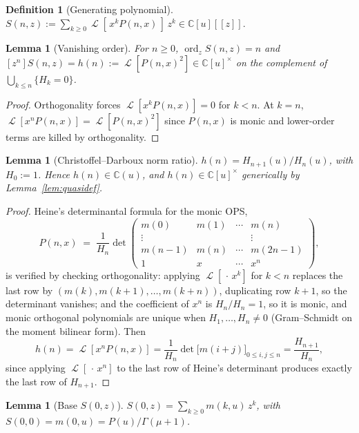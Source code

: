 \documentclass[11pt]{article}
\newtheorem{lemma}[theorem]{Lemma}
\theoremstyle{definition}
\newtheorem{definition}[theorem]{Definition}
\DeclareMathOperator{\Lop}{\mathcal{L}}
\DeclareMathOperator{\ord}{ord}
\begin{document}
\begin{definition}[Generating polynomial]\label{def:Sn}
$S(n,z) := \sum_{k\geq 0} \Lop[\, x^{k} P(n,x)\,]\, z^{k}
\in \mathbb{C}[u][[z]]$.
\end{definition}

\begin{lemma}[Vanishing order]\label{lem:vanord}
For $n\geq 0$,
$\ord_{z} S(n,z) = n$ and $[z^{n}] S(n,z) = h(n) := \Lop[P(n,x)^{2}]
\in \mathbb{C}[u]^{\times}$ on the complement of
$\bigcup_{k\leq n}\{H_{k}=0\}$.
\end{lemma}

\begin{proof}
Orthogonality forces $\Lop[x^{k} P(n,x)] = 0$ for $k < n$. At $k=n$,
$\Lop[x^{n} P(n,x)] = \Lop[P(n,x)^{2}]$ since $P(n,x)$ is monic and
lower-order terms are killed by orthogonality.
\end{proof}

\begin{lemma}[Christoffel--Darboux norm ratio]\label{lem:hratio}
$h(n) = H_{n+1}(u)/H_{n}(u)$, with $H_{0} := 1$. Hence
$h(n) \in \mathbb{C}(u)$, and $h(n) \in \mathbb{C}[u]^{\times}$
generically by Lemma~\ref{lem:quasidef}.
\end{lemma}

\begin{proof}
Heine's determinantal formula for the monic OPS,
\[
P(n,x) \;=\; \frac{1}{H_{n}}
\det\!\begin{pmatrix}
m(0) & m(1) & \cdots & m(n) \\
\vdots & & & \vdots \\
m(n-1) & m(n) & \cdots & m(2n-1) \\
1 & x & \cdots & x^{n}
\end{pmatrix},
\]
is verified by checking orthogonality: applying $\Lop[\,\cdot\,x^{k}]$
for $k < n$ replaces the last row by
$(m(k), m(k+1), \ldots, m(k+n))$, duplicating row $k+1$, so the
determinant vanishes; and the coefficient of $x^{n}$ is
$H_{n}/H_{n} = 1$, so it is monic, and monic orthogonal polynomials
are unique when $H_{1},\ldots,H_{n} \neq 0$ (Gram--Schmidt on the
moment bilinear form). Then
\[
h(n) = \Lop[x^{n} P(n,x)]
= \frac{1}{H_{n}} \det\!\bigl[ m(i+j) \bigr]_{0\leq i,j\leq n}
= \frac{H_{n+1}}{H_{n}},
\]
since applying $\Lop[\,\cdot\,x^{n}]$ to the last row of Heine's
determinant produces exactly the last row of $H_{n+1}$.
\end{proof}

\begin{lemma}[Base $S(0,z)$]\label{lem:S0}
$S(0,z) = \sum_{k\geq 0} m(k,u)\, z^{k}$, with $S(0,0) = m(0,u) = P(u)/\Gamma(\mu+1)$.
\end{lemma}
\end{document}
